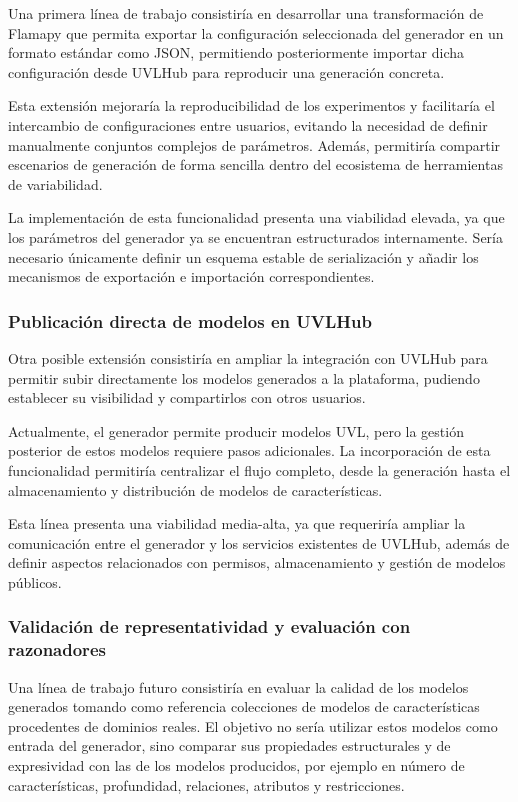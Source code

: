 Una primera línea de trabajo consistiría en desarrollar una transformación de
Flamapy que permita exportar la configuración seleccionada del generador en un
formato estándar como JSON, permitiendo posteriormente importar dicha
configuración desde UVLHub para reproducir una generación concreta.

Esta extensión mejoraría la reproducibilidad de los experimentos y facilitaría
el intercambio de configuraciones entre usuarios, evitando la necesidad de
definir manualmente conjuntos complejos de parámetros. Además, permitiría
compartir escenarios de generación de forma sencilla dentro del ecosistema de
herramientas de variabilidad.

La implementación de esta funcionalidad presenta una viabilidad elevada, ya que
los parámetros del generador ya se encuentran estructurados internamente. Sería
necesario únicamente definir un esquema estable de serialización y añadir los
mecanismos de exportación e importación correspondientes.

\subsubsection*{Publicación directa de modelos en UVLHub}

Otra posible extensión consistiría en ampliar la integración con UVLHub para
permitir subir directamente los modelos generados a la plataforma, pudiendo
establecer su visibilidad y compartirlos con otros usuarios.

Actualmente, el generador permite producir modelos UVL, pero la gestión posterior
de estos modelos requiere pasos adicionales. La incorporación de esta
funcionalidad permitiría centralizar el flujo completo, desde la generación
hasta el almacenamiento y distribución de modelos de características.

Esta línea presenta una viabilidad media-alta, ya que requeriría ampliar la
comunicación entre el generador y los servicios existentes de UVLHub, además de
definir aspectos relacionados con permisos, almacenamiento y gestión de modelos
públicos.

\subsubsection*{Validación de representatividad y evaluación con razonadores}

Una línea de trabajo futuro consistiría en evaluar la calidad de los modelos
generados tomando como referencia colecciones de modelos de características
procedentes de dominios reales. El objetivo no sería utilizar estos modelos como
entrada del generador, sino comparar sus propiedades estructurales y de
expresividad con las de los modelos producidos, por ejemplo en número de
características, profundidad, relaciones, atributos y restricciones.

